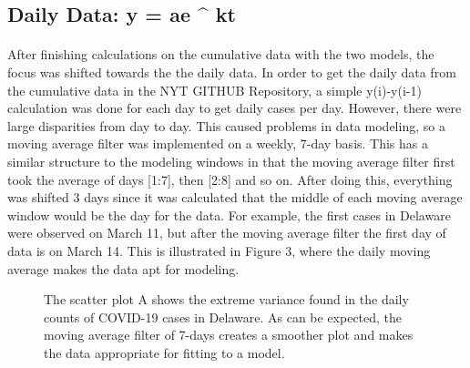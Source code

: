 \documentclass[12pt]{article}
\begin{document}
\subsection{Daily Data: y = ae ^ {kt}}
\paragraph{} After finishing calculations on the cumulative data with the two models, the focus was shifted towards the the daily data. In order to get the daily data from the cumulative data in the NYT GITHUB Repository, a simple y(i)-y(i-1) calculation was done for each day to get daily cases per day. However, there were large disparities from day to day. This caused problems in data modeling, so a moving average filter was implemented on a weekly, 7-day basis. This has a similar structure to the modeling windows in that the moving average filter first took the average of days [1:7], then [2:8] and so on. After doing this, everything was shifted 3 days since it was calculated that the middle of each moving average window would be the day for the data. For example, the first cases in Delaware were observed on March 11, but after the moving average filter the first day of data is on March 14. This is illustrated in Figure 3, where the daily moving average makes the data apt for modeling.
\begin{figure}[h]
  \centering
  \hfill
  \caption{The scatter plot A shows the extreme variance found in the daily counts of COVID-19 cases in Delaware. As can be expected, the moving average filter of 7-days creates a smoother plot and makes the data appropriate for fitting to a model.}
  \label{fig:4}
\end{figure}
\end{document}
